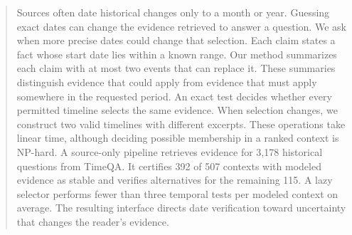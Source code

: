\begin{abstract}
Sources often date historical changes only to a month or year.
Guessing exact dates can change the evidence retrieved to answer a question.
We ask when more precise dates could change that selection.
Each claim states a fact whose start date lies within a known range.
Our method summarizes each claim with at most two events that can replace it.
These summaries distinguish evidence that could apply from evidence that must apply somewhere in the requested period.
An exact test decides whether every permitted timeline selects the same evidence.
When selection changes, we construct two valid timelines with different excerpts.
These operations take linear time, although deciding possible membership in a ranked context is NP-hard.
A source-only pipeline retrieves evidence for 3,178 historical questions from TimeQA.
It certifies 392 of 507 contexts with modeled evidence as stable and verifies alternatives for the remaining 115.
A lazy selector performs fewer than three temporal tests per modeled context on average.
The resulting interface directs date verification toward uncertainty that changes the reader's evidence.
\end{abstract}
